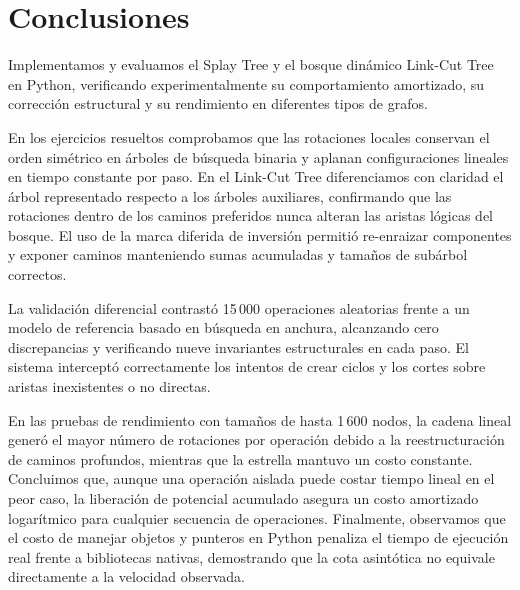 \section{Conclusiones}

Implementamos y evaluamos el Splay Tree y el bosque dinámico Link-Cut Tree en Python, verificando experimentalmente su comportamiento amortizado, su corrección estructural y su rendimiento en diferentes tipos de grafos.

En los ejercicios resueltos comprobamos que las rotaciones locales conservan el orden simétrico en árboles de búsqueda binaria y aplanan configuraciones lineales en tiempo constante por paso. En el Link-Cut Tree diferenciamos con claridad el árbol representado respecto a los árboles auxiliares, confirmando que las rotaciones dentro de los caminos preferidos nunca alteran las aristas lógicas del bosque. El uso de la marca diferida de inversión permitió re-enraizar componentes y exponer caminos manteniendo sumas acumuladas y tamaños de subárbol correctos.

La validación diferencial contrastó 15\,000 operaciones aleatorias frente a un modelo de referencia basado en búsqueda en anchura, alcanzando cero discrepancias y verificando nueve invariantes estructurales en cada paso. El sistema interceptó correctamente los intentos de crear ciclos y los cortes sobre aristas inexistentes o no directas.

En las pruebas de rendimiento con tamaños de hasta 1\,600 nodos, la cadena lineal generó el mayor número de rotaciones por operación debido a la reestructuración de caminos profundos, mientras que la estrella mantuvo un costo constante. Concluimos que, aunque una operación aislada puede costar tiempo lineal en el peor caso, la liberación de potencial acumulado asegura un costo amortizado logarítmico para cualquier secuencia de operaciones. Finalmente, observamos que el costo de manejar objetos y punteros en Python penaliza el tiempo de ejecución real frente a bibliotecas nativas, demostrando que la cota asintótica no equivale directamente a la velocidad observada.
